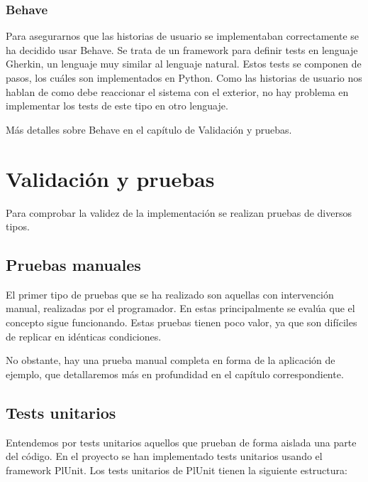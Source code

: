 \documentclass[12pt]{report} %
\begin{document}
\subsection{Behave}
Para asegurarnos que las historias de usuario se implementaban correctamente se ha decidido usar Behave.
Se trata de un framework para definir tests en lenguaje Gherkin, un lenguaje muy similar al lenguaje natural. Estos tests se componen de pasos,
los cuáles son implementados en Python. Como las historias de usuario nos hablan de como debe reaccionar el sistema con el exterior, no hay problema en implementar los tests de este tipo en otro lenguaje.

Más detalles sobre Behave en el capítulo de Validación y pruebas.


\chapter{Validación y pruebas}

Para comprobar la validez de la implementación se realizan pruebas de diversos tipos.

\section{Pruebas manuales}

El primer tipo de pruebas que se ha realizado son aquellas con intervención manual, realizadas por el programador. En estas principalmente se evalúa que el concepto sigue funcionando. Estas pruebas tienen poco valor, ya que son difíciles de replicar en idénticas condiciones.

No obstante, hay una prueba manual completa en forma de la aplicación de ejemplo, que detallaremos más en profundidad en el capítulo correspondiente.

\section{Tests unitarios}

Entendemos por tests unitarios aquellos que prueban de forma aislada una parte del código. En el proyecto se han implementado tests unitarios usando el framework PlUnit. Los tests unitarios de PlUnit tienen la siguiente estructura:
\end{document}
